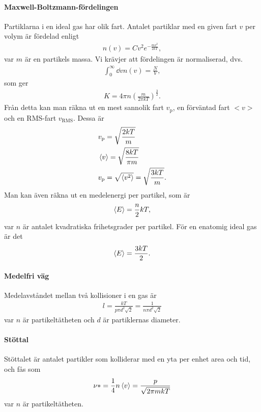 \paragraph{Maxwell-Boltzmann-fördelingen}
Partiklarna i en ideal gas har olik fart. Antalet partiklar med en given fart $v$ per volym är fördelad enligt
\begin{align*}
	n(v) = Cv^2e^{-\frac{mv^2}{2kT}},
\end{align*}
var $m$ är en partikels massa. Vi krävjer att fördelingen är normaliserad, dvs.
\begin{align*}
	\int_0^{\infty}\dd{v}n(v) = \frac{N}{V},
\end{align*}
som ger
\begin{align*}
	K = 4\pi n \left(\frac{m}{2\pi kT}\right)^\frac{3}{2}.
\end{align*}
Från detta kan man räkna ut en mest sannolik fart $v_\text{p}$, en förväntad fart $<v>$ och en RMS-fart $v_\text{RMS}$. Dessa är
\begin{align*}
	& v_\text{p} = \sqrt{\frac{2kT}{m}}\\
	& \expval{v} = \sqrt{\frac{8kT}{\pi m}}\\
	& v_\text{p} = \sqrt{\expval{v^2}} = \sqrt{\frac{3kT}{m}}.
\end{align*}
Man kan även räkna ut en medelenergi per partikel, som är
\begin{align*}
	\expval{E} = \frac{n}{2}kT,
\end{align*}
var $n$ är antalet kvadratiska frihetsgrader per partikel. För en enatomig ideal gas är det
\begin{align*}
	\expval{E} = \frac{3kT}{2}.
\end{align*}

\paragraph{Medelfri väg}
Medelavståndet mellan två kollisioner i en gas är
\begin{align*}
	l = \frac{kT}{p\pi d^2\sqrt{2}} = \frac{1}{n\pi d^2\sqrt{2}}
\end{align*}
var $n$ är partikeltätheten och $d$ är partiklernas diameter.

\paragraph{Stöttal}
Stöttalet är antalet partikler som kolliderar med en yta per enhet area och tid, och fås som
\begin{align*}
	\nu * = \frac{1}{4}n\expval{v} = \frac{p}{\sqrt{2\pi mkT}}
\end{align*}
var $n$ är partikeltätheten.